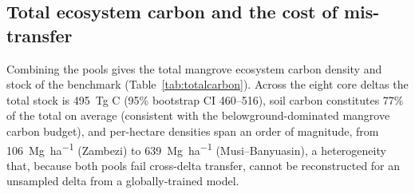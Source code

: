 \documentclass[twocolumn,9pt]{extarticle}
\begin{document}
\begin{table}[t]
\centering
\caption{Mangrove blue carbon versus terrestrial soil organic carbon under the same
out-of-region protocol. Terrestrial soil carbon, evaluated on $\sim$133{,}000
globally-distributed WoSIS profiles under leave-one-continent-out, transfers far better
than mangrove blue carbon: positive correlation and $R^2$ out of region versus near-zero
correlation and zero AOA coverage for mangroves.}
\label{tab:terrestrial}

\end{table}

\subsection*{Total ecosystem carbon and the cost of mis-transfer}
Combining the pools gives the total mangrove ecosystem carbon density and stock of the
benchmark (Table~\ref{tab:totalcarbon}). Across the eight core deltas the total stock
is \SI{495}{\tera\gram} C (95\% bootstrap CI 460--516), soil carbon constitutes 77\% of
the total on average
(consistent with the belowground-dominated mangrove carbon budget), and per-hectare
densities span an order of magnitude, from \SI{106}{\mega\gram\per\hectare} (Zambezi)
to \SI{639}{\mega\gram\per\hectare} (Musi--Banyuasin), a heterogeneity that, because
both pools fail cross-delta transfer, cannot be reconstructed for an unsampled delta from
a globally-trained model.

\begin{table}[t]
\centering
\caption{Total ecosystem carbon per core delta: mean AGB-C, median SOC, their sum
(Mg\,ha$^{-1}$), the soil-carbon fraction, and the delta stock (Tg\,C $=$ density
$\times$ mangrove area).}
\label{tab:totalcarbon}

\end{table}
\end{document}
